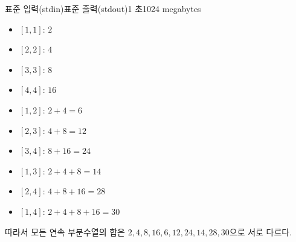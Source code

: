 \begin{problem}{\probtitle}{표준 입력(stdin)}{표준 출력(stdout)}{1 초}{1024 megabytes}
\begin{itemize}[topsep=0pt,noitemsep]
    \item $[1, 1]$: $2$
    \item $[2, 2]$: $4$
    \item $[3, 3]$: $8$
    \item $[4, 4]$: $16$
    \item $[1, 2]$: $2 + 4 = 6$
    \item $[2, 3]$: $4 + 8 = 12$
    \item $[3, 4]$: $8 + 16 = 24$
    \item $[1, 3]$: $2 + 4 + 8 = 14$
    \item $[2, 4]$: $4 + 8 + 16 = 28$
    \item $[1, 4]$: $2 + 4 + 8 + 16 = 30$
\end{itemize}

따라서 모든 연속 부분수열의 합은
$2, 4, 8, 16, 6, 12, 24, 14, 28, 30$으로 서로 다르다.

\end{problem}